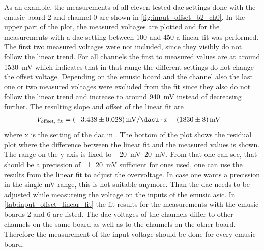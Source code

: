 As an example, the measurements of all eleven tested \ac{dac} settings done with the \ac{emusic} board 2 and channel 0 are shown in \autoref{fig:input_offset_b2_ch0}.
In the upper part of the plot, the measured voltages are plotted and for the measurements with a \ac{dac} setting between \SI{100}{\dacu} and \SI{450}{\dacu} a linear fit was performed.
The first two measured voltages were not included, since they visibly do not follow the linear trend.
For all channels the first to measured values are at around \SI{1530}{\milli\volt} which indicates that in that \si{\dacu} range the different settings do not change the offset voltage.
Depending on the \ac{emusic} board and the channel also the last one or two measured voltages were excluded from the fit since they also do not follow the linear trend and increase to around \SI{940}{\milli\volt} instead of decreasing further.
The resulting slope and offset of the linear fit are
\begin{align}
    V_\text{offset, fit} &= \SI{-3.438(28)}{\milli\volt\per\dacu}\cdot x+\SI{1830(8)}{\milli\volt}
\end{align}
where x is the setting of the \ac{dac} in \si{\dacu}.
The bottom of the plot shows the residual plot where the difference between the linear fit and the measured values is shown.
The range on the y-axis is fixed to \SIrange{-20}{20}{\milli\volt}.
From that one can see, that should be a precission of \SI{+-20}{\milli\volt} sufficient for ones used, one can use the results from the linear fit to adjust the overvoltage.
In case one wants a precission in the single \si{\milli\volt} range, this is not suitable anymore.
Than the \ac{dac} needs to be adjusted while measureing the voltage on the inputs of the \ac{emusic} \ac{asic}.
In \autoref{tab:input_offset_linear_fit} the fit results for the measurements with the \ac{emusic} boards 2 and 6 are listed.
The \ac{dac} voltages of the channels differ to other channels on the same board as well as to the channels on the other board.
Therefore the measurement of the input voltage should be done for every \ac{emusic} board.
